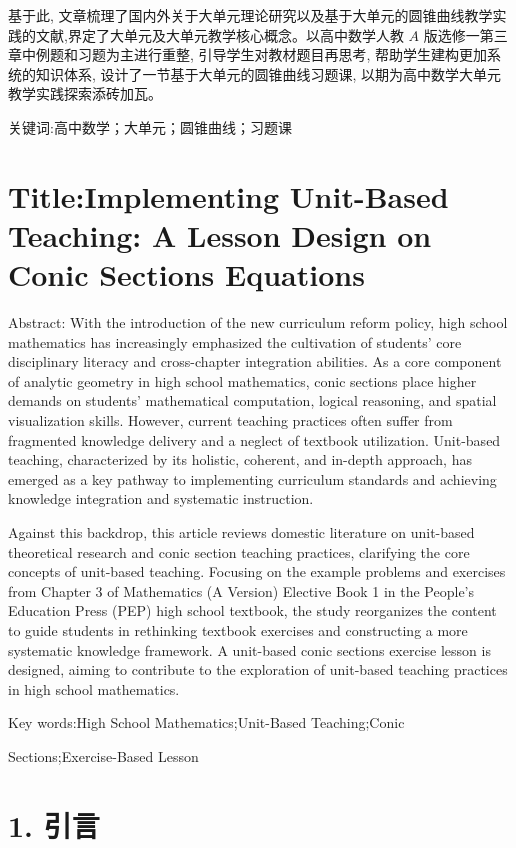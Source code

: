 \documentclass[10pt]{article}
\begin{document}
基于此, 文章梳理了国内外关于大单元理论研究以及基于大单元的圆锥曲线教学实践的文献,界定了大单元及大单元教学核心概念。以高中数学人教 \(A\) 版选修一第三章中例题和习题为主进行重整, 引导学生对教材题目再思考, 帮助学生建构更加系统的知识体系, 设计了一节基于大单元的圆锥曲线习题课, 以期为高中数学大单元教学实践探索添砖加瓦。

关键词:高中数学；大单元；圆锥曲线；习题课

\section*{Title:Implementing Unit-Based Teaching: A Lesson Design on Conic Sections Equations}

Abstract: With the introduction of the new curriculum reform policy, high school mathematics has increasingly emphasized the cultivation of students' core disciplinary literacy and cross-chapter integration abilities. As a core component of analytic geometry in high school mathematics, conic sections place higher demands on students' mathematical computation, logical reasoning, and spatial visualization skills. However, current teaching practices often suffer from fragmented knowledge delivery and a neglect of textbook utilization. Unit-based teaching, characterized by its holistic, coherent, and in-depth approach, has emerged as a key pathway to implementing curriculum standards and achieving knowledge integration and systematic instruction.

Against this backdrop, this article reviews domestic literature on unit-based theoretical research and conic section teaching practices, clarifying the core concepts of unit-based teaching. Focusing on the example problems and exercises from Chapter 3 of Mathematics (A Version) Elective Book 1 in the People's Education Press (PEP) high school textbook, the study reorganizes the content to guide students in rethinking textbook exercises and constructing a more systematic knowledge framework. A unit-based conic sections exercise lesson is designed, aiming to contribute to the exploration of unit-based teaching practices in high school mathematics.

Key words:High School Mathematics;Unit-Based Teaching;Conic

Sections;Exercise-Based Lesson

\section*{1. 引言}
\end{document}
